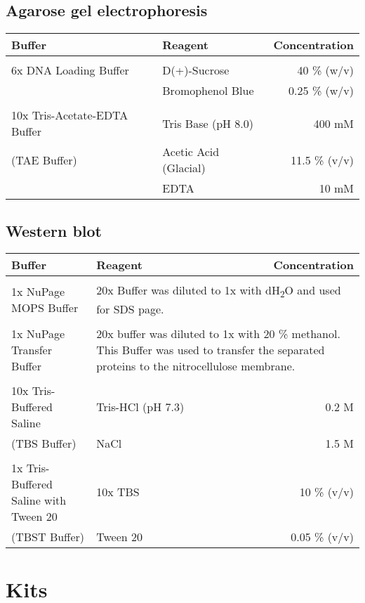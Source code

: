 \subsection{Agarose gel electrophoresis}
\begin{tabular}{l l r}
\textbf{Buffer} & \textbf{Reagent} & \textbf{Concentration}\\
\hline
\\
6x DNA Loading Buffer & D(+)-Sucrose & 40 \% (w/v) \\
& Bromophenol Blue & 0.25 \% (w/v)\\
\\
10x Tris-Acetate-EDTA Buffer & Tris Base (pH 8.0) & 400 mM \\
(TAE Buffer) & Acetic Acid (Glacial) & 11.5 \% (v/v) \\
& EDTA & 10 mM \\
\end{tabular}


\subsection{Western blot}
\begin{tabular}{l l r}
\textbf{Buffer} & \textbf{Reagent} & \textbf{Concentration}\\
\hline
\\
1x NuPage MOPS Buffer & \multicolumn{2}{p{8cm}}{20x Buffer was diluted to 1x with dH\textsubscript{2}O and used for SDS page.} \\
\\
1x NuPage Transfer Buffer & \multicolumn{2}{p{8cm}}{20x buffer was diluted to 1x with 20 \% methanol. This Buffer was used to transfer the separated proteins to the nitrocellulose membrane.} \\
\\
10x Tris-Buffered Saline & Tris-HCl (pH 7.3) & 0.2 M \\
(TBS Buffer) & NaCl & 1.5 M \\
\\
1x Tris-Buffered Saline with Tween 20 & 10x TBS & 10 \% (v/v) \\
(TBST Buffer) & Tween 20 & 0.05 \% (v/v)\\ 
\end{tabular}





\section{Kits}

